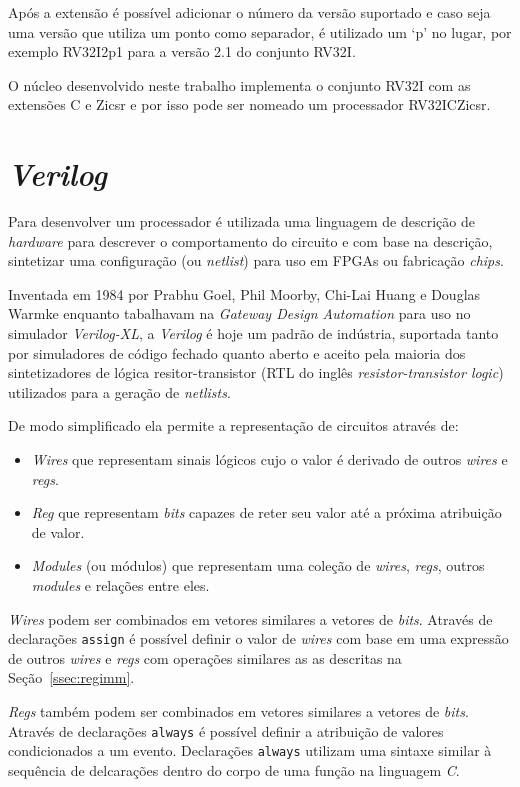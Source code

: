   Após a extensão é possível adicionar o número da versão suportado e caso seja uma versão que utiliza
  um ponto como separador, é utilizado um `p' no lugar, por exemplo RV32I2p1 para a versão 2.1
  do conjunto RV32I.

  O núcleo desenvolvido neste trabalho implementa o conjunto RV32I com as extensões C e Zicsr
  e por isso pode ser nomeado um processador RV32ICZicsr.

\newpage

\section{\emph{Verilog}}
\label{sec:Verilog}

Para desenvolver um processador é utilizada uma linguagem de descrição
de \emph{hardware} para descrever o comportamento do circuito e com base na descrição, sintetizar
uma configuração (ou \emph{netlist}) para uso em FPGAs ou fabricação \emph{chips}.

Inventada em 1984 por Prabhu Goel, Phil Moorby, Chi-Lai Huang e Douglas Warmke \citep{VEEH}
enquanto tabalhavam na \emph{Gateway Design Automation} para uso no simulador \emph{Verilog-XL},
a \emph{Verilog} é hoje um padrão de indústria, suportada tanto por simuladores de código fechado quanto
aberto e aceito pela maioria dos sintetizadores de lógica resitor-transistor (RTL do inglês
\emph{resistor-transistor logic}) utilizados para a geração de \emph{netlists}.

De modo simplificado ela permite a representação de circuitos através de:
\begin{itemize}
  \item \emph{Wires} que representam sinais lógicos cujo o valor é derivado de outros \emph{wires} e \emph{regs}.
  \item \emph{Reg} que representam \emph{bits} capazes de reter seu valor até a próxima atribuição de valor.
  \item \emph{Modules} (ou módulos) que representam uma coleção de \emph{wires}, \emph{regs}, outros \emph{modules} e relações entre eles.
\end{itemize}

\emph{Wires} podem ser combinados em vetores similares a vetores de \emph{bits}.
Através de declarações \texttt{assign} é possível definir o valor de \emph{wires} com base em uma expressão 
de outros \emph{wires} e \emph{regs} com operações similares as as descritas na Seção~\ref{ssec:regimm}.

\emph{Regs} também podem ser combinados em vetores similares a vetores de \emph{bits}.
Através de declarações \texttt{always} é possível definir a atribuição de valores condicionados a um evento.
Declarações \texttt{always} utilizam uma sintaxe similar à sequência de delcarações dentro do corpo de uma 
função na linguagem \emph{C}.

